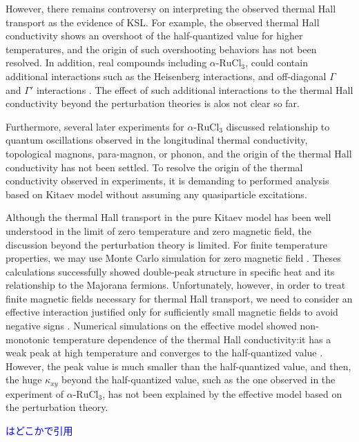 \documentclass[reprint,amsmath,amssymb,aps,prx]{revtex4-2}
\newcommand{\blue}[1]{\textcolor{blue}{#1}}
\begin{document}
However, there remains controversy on interpreting the observed thermal Hall transport as the evidence of KSL. For example, the observed thermal Hall conductivity shows an overshoot of the half-quantized value for higher temperatures, and the origin of such overshooting behaviors has not been resolved. In addition, real compounds including $\alpha$-$\mathrm{RuCl_3}$, could contain additional interactions such as the Heisenberg interactions, and off-diagonal $\Gamma$ and $\Gamma'$ interactions \cite{...}. The effect of such additional interactions to the thermal Hall conductivity beyond the perturbation theories \cite{xxx} is alos not clear so far.

Furthermore, several later experiments for $\alpha$-$\mathrm{RuCl_3}$ discussed relationship to quantum oscillations observed in the longitudinal thermal conductivity\cite{xxx}, topological magnons\cite{xxx}, para-magnon\cite{xxx}, or phonon\cite{xxx}, and the origin of the thermal Hall conductivity has not been settled. To resolve the origin of the thermal conductivity observed in experiments, it is demanding to performed analysis based on Kitaev model without assuming any quasiparticle excitations.

Although the thermal Hall transport in the pure Kitaev model has been well understood in the limit of zero temperature and zero magnetic field\cite{Kitaev2006}, the discussion beyond the perturbation theory is limited. For finite temperature properties, we may use Monte Carlo simulation for zero magnetic field \cite{NasuUM2014,NasuUM2015}. Theses calculations successfully showed double-peak structure in specific heat and its relationship to the Majorana fermions. Unfortunately, however, in order to treat finite magnetic fields necessary for thermal Hall transport, we need to consider an effective interaction justified only for sufficiently small magnetic fields to avoid negative signs \cite{NasuYM2017}. Numerical simulations on the effective model showed non-monotonic temperature dependence of the thermal Hall conductivity:it has a weak peak at high temperature and converges to the half-quantized value \cite{NasuYM2017}. However, the peak value is much smaller than the half-quantized value, and then, the huge $\kappa_{xy}$ beyond the half-quantized value, such as the one observed in the experiment of $\alpha$-$\mathrm{RuCl_3}$, has not been explained by the effective model based on the perturbation theory.

\blue{\cite{Rau2014,Rau2014pre}はどこかで引用}
\end{document}
